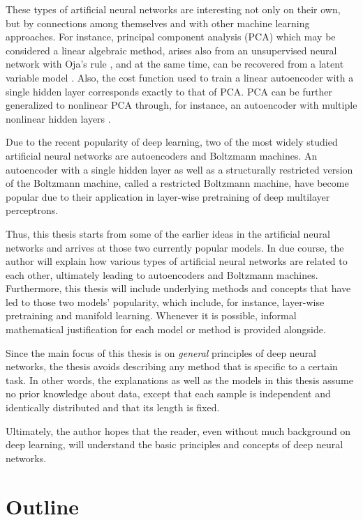 \documentclass[dissertation,nocontribution]{aaltoseries}
\begin{document}
These types of artificial neural networks are interesting
not only on their own, but by connections among themselves
and with other machine learning approaches. For instance,
principal component analysis
(PCA) which
may be considered a linear algebraic method, arises also
from an unsupervised neural network with Oja's rule
\citep{Oja1982}, and at the same time, can be recovered from
a latent variable model \citep{Tipping1999,Roweis1998}.
Also, the cost function used to train a linear autoencoder
with a single hidden layer corresponds exactly to that of
PCA.  PCA can be further generalized to nonlinear PCA
through, for instance, an autoencoder with multiple
nonlinear hidden layers \citep{Kramer1991,Oja1991}. 

Due to the recent popularity of deep learning, two of
the most widely studied artificial neural networks are
autoencoders and Boltzmann machines.  An autoencoder with a
single hidden layer as well as a structurally restricted
version of the Boltzmann machine, called a restricted
Boltzmann machine, have become popular due to their
application in layer-wise pretraining of deep multilayer
perceptrons. 

Thus, this thesis starts from some of the earlier ideas in
the artificial neural networks and arrives at those two
currently popular models. In due course, the author will
explain how various types of artificial neural networks are
related to each other, ultimately leading to autoencoders
and Boltzmann machines. Furthermore, this thesis will
include underlying methods and concepts that have led to
those two models' popularity, which include, for instance,
layer-wise pretraining and manifold learning.  Whenever it
is possible, informal mathematical justification for each
model or method is provided alongside.

Since the main focus of this thesis is on \textit{general}
principles of deep neural networks, the thesis 
avoids describing any method that is specific to a certain
task. In other words, the explanations as well as the models
in this thesis assume no prior knowledge about data, except
that each sample is independent and identically distributed
and that its length is fixed. 

Ultimately, the author hopes that the reader, even without
much background on deep learning, will understand the basic
principles and concepts of deep neural networks. 


\section{Outline}
\end{document}
